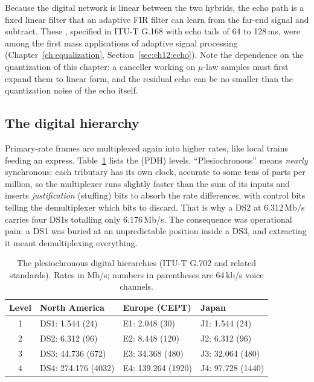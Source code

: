 
Because the digital network is linear between the two hybrids, the echo path is a fixed linear
filter that an adaptive FIR filter can learn from the far-end signal and subtract. These
, specified in ITU-T G.168 with echo tails of 64 to 128\,ms, were among the
first mass applications of adaptive signal processing (Chapter~\ref{ch:equalization},
Section~\ref{sec:ch12:echo}). Note the dependence on the quantization of this chapter: a canceller
working on $\mu$-law samples must first expand them to linear form, and the residual echo can be no
smaller than the quantization noise of the echo itself.

\subsection{The digital hierarchy}

Primary-rate frames are multiplexed again into higher rates, like local trains feeding an express.
Table~\ref{tab:ch05:pdh} lists the  (PDH) levels.
``Plesiochronous'' means \emph{nearly} synchronous: each tributary has its own clock, accurate to
some tens of parts per million, so the multiplexer runs slightly faster than the sum of its inputs
and inserts \emph{justification} (stuffing) bits to absorb the rate differences, with control bits
telling the demultiplexer which bits to discard. That is why a DS2 at 6.312\,Mb/s carries four DS1s
totalling only 6.176\,Mb/s. The consequence was operational pain: a DS1 was buried at an
unpredictable position inside a DS3, and extracting it meant demultiplexing everything.

\begin{table}[htbp]\centering\small
\caption{The plesiochronous digital hierarchies (ITU-T G.702 and related standards). Rates in
Mb/s; numbers in parentheses are 64\,kb/s voice channels.}
\label{tab:ch05:pdh}
\begin{tabular}{@{}c l l l@{}}
\toprule
Level & North America & Europe (CEPT) & Japan \\
\midrule
1 & DS1: 1.544 (24) & E1: 2.048 (30) & J1: 1.544 (24) \\
2 & DS2: 6.312 (96) & E2: 8.448 (120) & J2: 6.312 (96) \\
3 & DS3: 44.736 (672) & E3: 34.368 (480) & J3: 32.064 (480) \\
4 & DS4: 274.176 (4032) & E4: 139.264 (1920) & J4: 97.728 (1440) \\
\bottomrule
\end{tabular}
\end{table}

